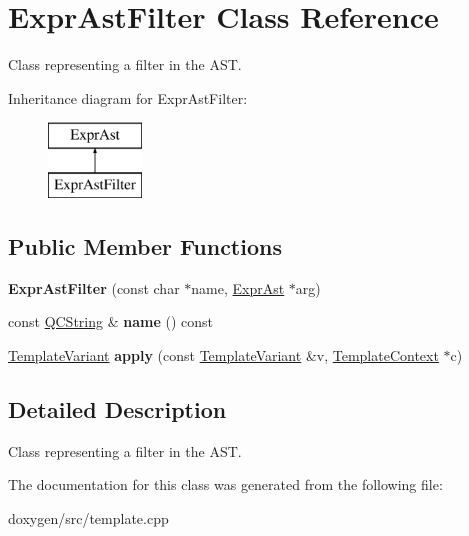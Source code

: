 \hypertarget{class_expr_ast_filter}{}\section{Expr\+Ast\+Filter Class Reference}
\label{class_expr_ast_filter}


Class representing a filter in the A\+ST.  


Inheritance diagram for Expr\+Ast\+Filter\+:\begin{figure}[H]
\begin{center}
\leavevmode
\includegraphics[height=2.000000cm]{class_expr_ast_filter}
\end{center}
\end{figure}
\subsection*{Public Member Functions}
\begin{DoxyCompactItemize}
\item 
\mbox{\label{class_expr_ast_filter_a850d9eeab8c17d7f795920cf40800626}} 
{\bfseries Expr\+Ast\+Filter} (const char $\ast$name, \mbox{\hyperlink{class_expr_ast}{Expr\+Ast}} $\ast$arg)
\item 
\mbox{\label{class_expr_ast_filter_a59c410c9351716ffa84a023865263250}} 
const \mbox{\hyperlink{class_q_c_string}{Q\+C\+String}} \& {\bfseries name} () const
\item 
\mbox{\label{class_expr_ast_filter_aa3af204f6742e748f10b8e690d20d86a}} 
\mbox{\hyperlink{class_template_variant}{Template\+Variant}} {\bfseries apply} (const \mbox{\hyperlink{class_template_variant}{Template\+Variant}} \&v, \mbox{\hyperlink{class_template_context}{Template\+Context}} $\ast$c)
\end{DoxyCompactItemize}


\subsection{Detailed Description}
Class representing a filter in the A\+ST. 

The documentation for this class was generated from the following file\+:\begin{DoxyCompactItemize}
\item 
doxygen/src/template.\+cpp\end{DoxyCompactItemize}
